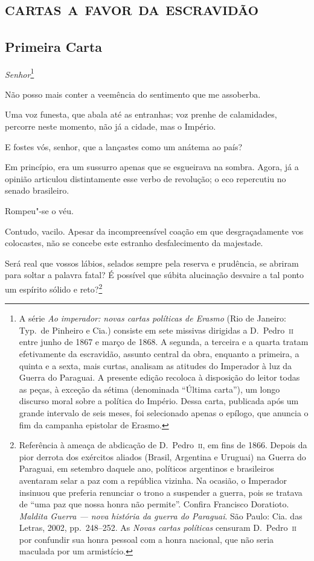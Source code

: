 \part{\textsc{cartas a favor da escravidão}}

\chapter{Primeira Carta}

\begingroup
\linenumbers

\noindent\textit{Senhor}\footnote{ A série \textit{Ao imperador: novas cartas políticas de Erasmo}
(Rio de Janeiro: Typ.~de Pinheiro e Cia.) consiste em sete missivas
dirigidas a D.~Pedro~\textsc{ii} entre junho de 1867 e março de 1868. A segunda,
a terceira e a quarta tratam efetivamente da escravidão, assunto
central da obra, enquanto a primeira, a quinta e a sexta, mais curtas,
analisam as atitudes do Imperador à luz da Guerra do Paraguai. A
presente edição recoloca à disposição do leitor todas as peças, à
exceção da sétima (denominada ``Última carta''), um longo discurso moral sobre a política
do Império. Dessa carta, publicada após um grande intervalo de seis
meses, foi selecionado apenas o epílogo, que anuncia o fim da
campanha epistolar de Erasmo.}\smallskip

Não posso mais conter a veemência do sentimento que me assoberba. 

Uma voz funesta, que abala até as entranhas; voz prenhe de calamidades,
percorre neste momento, não já a cidade, mas o Império. 

E fostes vós, senhor, que a lançastes como um anátema ao país? 

Em princípio, era um sussurro apenas que se esgueirava na sombra.
Agora, já a opinião articulou distintamente esse verbo de revolução; o
eco repercutiu no senado brasileiro. 

 Rompeu"-se o véu. 

 Contudo, vacilo. Apesar da incompreensível coação em que
desgraçadamente vos colocastes, não se concebe este estranho
desfalecimento da majestade. 

 Será real que vossos lábios, selados sempre pela reserva e prudência,
se abriram para soltar a palavra fatal? É possível que súbita
alucinação desvaire a tal ponto um espírito sólido e
reto?\footnote{ Referência à ameaça de abdicação de D.~Pedro~\textsc{ii}, em fins de 1866. Depois da pior
derrota dos exércitos aliados (Brasil, Argentina e Uruguai) na Guerra
do Paraguai, em setembro daquele ano, políticos argentinos e
brasileiros aventaram selar a paz com a república vizinha. Na ocasião,
o Imperador insinuou que preferia renunciar o trono a suspender a
guerra, pois se tratava de ``uma paz que nossa honra não permite''.
Confira Francisco Doratioto. \textit{Maldita Guerra --- nova história da
guerra do Paraguai}. São Paulo: Cia. das Letras, 2002, pp.~248--252.
As \textit{Novas cartas políticas} censuram D.~Pedro~\textsc{ii} por confundir
sua honra pessoal com a honra nacional, que não seria maculada por um armistício.}
 
